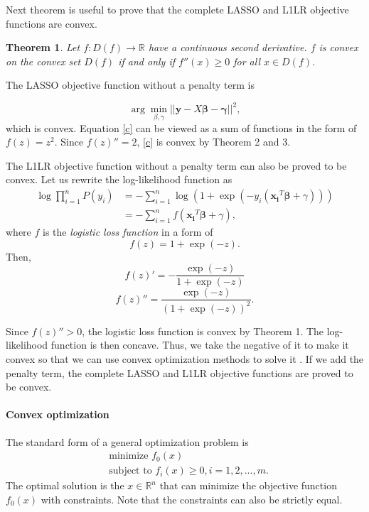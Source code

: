 \documentclass{article}
\newtheorem{Theorem}{Theorem}
\begin{document}
Next theorem is useful to prove that the complete LASSO and L1LR objective functions are convex.

\vspace*{\baselineskip}
\begin{Theorem}\label{thm:3}
Let $f: D(f) \rightarrow \mathbb{R}$ have a continuous second derivative.  $f$ is convex on the convex set $D(f)$ if and only if $f''(x) \geq 0$ for all $x\in D(f)$.
\end{Theorem}

The LASSO objective function without a penalty term is

\begin{equation}\label{c}
\arg \min_{\beta,\gamma} ||\textbf{y}-X\boldsymbol{\beta}-\boldsymbol{\gamma}||^2,
\end{equation}
which is convex. Equation \eqref{c} can be viewed as a sum of functions in the form of $f(z)=z^2$. Since $f(z)''=2$, \eqref{c} is convex by Theorem 2 and 3.

The L1LR objective function without a penalty term can also be proved to be convex. Let us rewrite the log-likelihood function as
\begin{align*}
\log\prod_{i=1}^n P(y_i)
&=-\sum_{i=1}^n \log(1+\exp(-y_i(\boldsymbol{x_i}^T\boldsymbol{\beta}+\gamma)))\\
&=-\sum_{i=1}^n f(\boldsymbol{x_i}^T\boldsymbol{\beta}+\gamma),
\end{align*}
where $f$ is the \emph{logistic loss function} in a form of 
$$f(z)=1+\exp(-z).$$
Then,
$$f(z)'=-\frac{\exp(-z)}{1+\exp(-z)}$$
$$f(z)''=\frac{\exp(-z)}{(1+\exp(-z))^2}.$$

Since $f(z)''>0$, the logistic loss function is convex by Theorem 1. The log-likelihood function is then concave. Thus, we take the negative of it to make it convex so that we can use convex optimization methods to solve it \cite{convex}.  
If we add the penalty term, the complete LASSO and L1LR objective functions are proved to be convex.
\paragraph{Convex optimization}
The standard form of a general optimization problem is
\begin{align*}
&\text{minimize } f_0(x)\\
&\text{subject to } f_i(x) \geq 0, i=1,2,...,m.
\end{align*}
The optimal solution is the $x \in \mathbb{R}^n$ that can minimize the objective function $f_0(x)$ with constraints. Note that the constraints can also be strictly equal.
\end{document}
